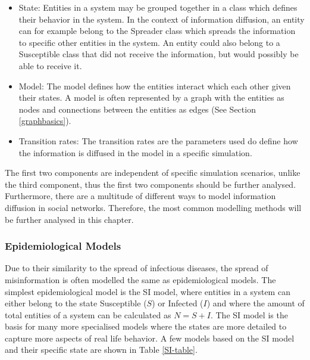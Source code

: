 \begin{itemize}
    \item State: Entities in a system may be grouped together in a class which
    defines their behavior in the system. In the context of information diffusion,
    an entity can for example belong to the  \glqq Spreader \grqq{} class which spreads the information
    to specific other entities in the system. An entity could also belong to a
    \glqq Susceptible \grqq{} class that did not receive the information, 
    but would possibly be able to receive it.
    \item Model: The model defines how the entities interact which each other
    given their states. A model is often represented by a graph with the entities
    as nodes and connections between the entities as edges 
    (See Section \ref{graphbasics}).
    \item Transition rates: The transition rates are the parameters used
    do define how the information is diffused in the model in a specific simulation. 
\end{itemize}

The first two components are independent of specific simulation scenarios,
unlike the third component, thus the first two components should be further
analysed. Furthermore, there are a multitude of different ways 
to model information diffusion in social networks. Therefore, the most common
modelling methods will be further analysed in this chapter.

\subsubsection{Epidemiological Models}

Due to their similarity to the spread of infectious diseases, 
the spread of misinformation is often modelled the same as epidemiological models.
The simplest epidemiological model is the SI model, where entities in a system
can either belong to the state \glqq Susceptible\grqq{} ($S$) or 
\glqq Infected\grqq{} ($I$) and where the amount of total entities of a 
system can be calculated as $N=S+I$. The SI model is the basis for many
more specialised models where the states are more detailed to capture more 
aspects of real life behavior. A few models based on the SI model and their 
specific state are shown in Table \ref{SI-table}.

